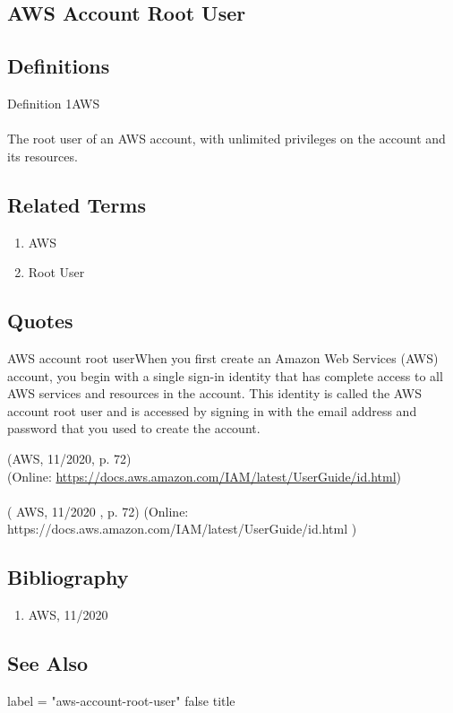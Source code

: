 \newpage \subsection*{AWS Account Root User } \subsection*{Definitions } \begin{DIC_Def}{Definition 1AWS }{} \paragraph{} The root user of an AWS account, with unlimited privileges on the account and its resources.  \end{DIC_Def} \subsection*{Related Terms } \begin{enumerate} \item  AWS  \item  Root User  \end{enumerate} \subsection*{Quotes } \begin{DIC_BlockQuote} AWS account root userWhen you first create an Amazon Web Services (AWS) account, you begin with a single sign-in identity that has complete access to all AWS services and resources in the account. This identity is called the AWS account root user and is accessed by signing in with the email address and password that you used to create the account.  \end{DIC_BlockQuote} (AWS, 11/2020, p. 72)\\ (Online: \url{https://docs.aws.amazon.com/IAM/latest/UserGuide/id.html})  \paragraph{} (  AWS, 11/2020  , p. 72)  (Online:  https://docs.aws.amazon.com/IAM/latest/UserGuide/id.html  )  \subsection*{Bibliography } \begin{enumerate} \item  AWS, 11/2020    \end{enumerate} \subsection*{See Also } label = "aws-account-root-user"  false  title  
